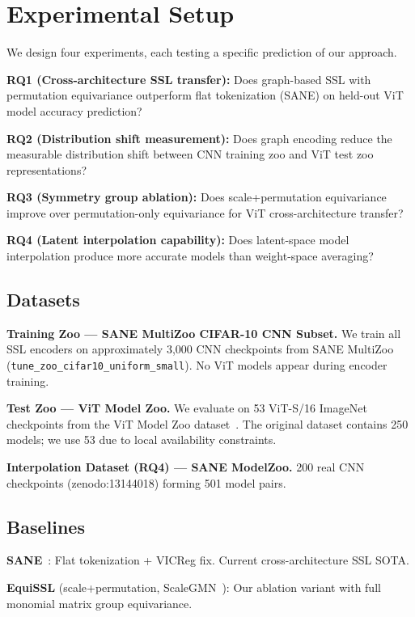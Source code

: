 \section{Experimental Setup}
\label{sec:setup}

We design four experiments, each testing a specific prediction of our approach.

\textbf{RQ1 (Cross-architecture SSL transfer):}
Does graph-based SSL with permutation equivariance outperform flat tokenization (SANE)
on held-out ViT model accuracy prediction?

\textbf{RQ2 (Distribution shift measurement):}
Does graph encoding reduce the measurable distribution shift between CNN training zoo
and ViT test zoo representations?

\textbf{RQ3 (Symmetry group ablation):}
Does scale+permutation equivariance improve over permutation-only equivariance for
ViT cross-architecture transfer?

\textbf{RQ4 (Latent interpolation capability):}
Does latent-space model interpolation produce more accurate models than weight-space averaging?

\subsection*{Datasets}

\textbf{Training Zoo --- SANE MultiZoo CIFAR-10 CNN Subset.}
We train all SSL encoders on approximately 3{,}000 CNN checkpoints from SANE
MultiZoo~\cite{Schurholt2024Towards} (\texttt{tune\_zoo\_cifar10\_uniform\_small}).
No ViT models appear during encoder training.

\textbf{Test Zoo --- ViT Model Zoo.}
We evaluate on 53 ViT-S/16 ImageNet checkpoints from the ViT Model Zoo
dataset~\cite{Falk2025ModelZoo}.
The original dataset contains 250 models; we use 53 due to local availability constraints.

\textbf{Interpolation Dataset (RQ4) --- SANE ModelZoo.}
200 real CNN checkpoints (zenodo:13144018) forming 501 model pairs.

\subsection*{Baselines}

\textbf{SANE}~\cite{Schurholt2024Towards}: Flat tokenization + VICReg fix.
Current cross-architecture SSL SOTA.

\textbf{EquiSSL} (scale+permutation, ScaleGMN~\cite{Kalogeropoulos2024Scale}):
Our ablation variant with full monomial matrix group equivariance.

